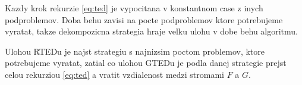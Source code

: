Kazdy krok rekurzie \ref{eq:ted} je vypocitana v konstantnom case z inych podproblemov.
Doba behu zavisi na pocte podproblemov ktore potrebujeme vyratat, takze dekompozicna
strategia hraje velku ulohu v dobe behu algoritmu.

Ulohou RTEDu je najst strategiu s najnizsim poctom problemov, ktore potrebujeme vyratat,
zatial co ulohou GTEDu je podla danej strategie prejst celou rekurziou \ref{eq:ted} a vratit
vzdialenost medzi stromami $F$ a $G$.








